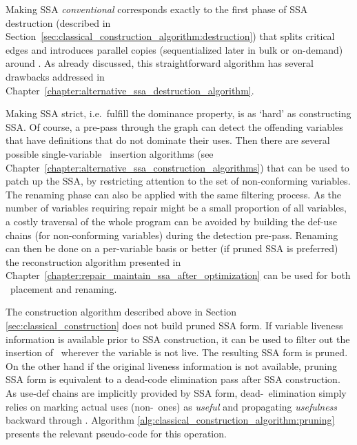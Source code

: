 Making SSA \textit{conventional} corresponds exactly to the first phase of SSA destruction (described in Section~\ref{sec:classical_construction_algorithm:destruction}) that splits critical edges and introduces parallel copies (sequentialized later in bulk or on-demand) around \phifuns. As already discussed, this straightforward algorithm has several drawbacks addressed in Chapter~\ref{chapter:alternative_ssa_destruction_algorithm}.

Making SSA strict, i.e.\ fulfill the dominance property, is as `hard' as constructing SSA. Of course, a pre-pass through the graph can detect the offending variables that have definitions that do not dominate their uses. Then there are several possible single-variable \phifun\ insertion algorithms (see Chapter~\ref{chapter:alternative_ssa_construction_algorithms}) that can be used to patch up the SSA, by restricting attention to the set of non-conforming variables. The renaming phase can also be applied with the same filtering process. As the number of variables requiring repair might be a small proportion of all variables, a costly traversal of the whole program can be avoided by building the def-use chains (for non-conforming variables) during the detection pre-pass. Renaming can then be done on a per-variable basis or better (if pruned SSA is preferred) the reconstruction algorithm presented in Chapter~\ref{chapter:repair_maintain_ssa_after_optimization} can be used for both \phifuns\ placement and renaming.

The construction algorithm described above in
Section \ref{sec:classical_construction} does not
build pruned SSA form. 
If variable liveness information is available prior
to SSA construction, it can be used to filter out the 
insertion of \phifuns\ wherever the variable is not live.
The resulting SSA form is pruned.
On the other hand
if the original liveness information is not available, 
pruning SSA form is equivalent to a dead-code elimination pass
after SSA construction.
As use-def chains are implicitly provided by SSA form, 
dead-\phifun\ elimination simply relies on marking actual uses 
(non-\phifun\ ones) as \emph{useful} and propagating 
\emph{usefulness} backward through \phifuns.
Algorithm \ref{alg:classical_construction_algorithm:pruning} 
presents the relevant pseudo-code for this operation.

